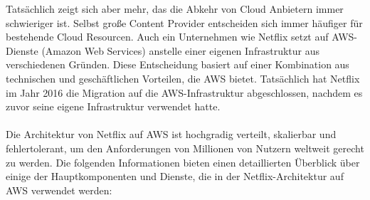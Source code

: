 Tatsächlich zeigt sich aber mehr, das die Abkehr von Cloud Anbietern immer schwieriger ist. Selbst große Content Provider entscheiden sich immer häufiger für bestehende Cloud Resourcen. Auch ein Unternehmen wie Netflix setzt auf AWS-Dienste (Amazon Web Services) anstelle einer eigenen Infrastruktur aus verschiedenen Gründen. Diese Entscheidung basiert auf einer Kombination aus technischen und geschäftlichen Vorteilen, die AWS bietet. Tatsächlich hat Netflix im Jahr 2016 die Migration auf die AWS-Infrastruktur abgeschlossen, nachdem es zuvor seine eigene Infrastruktur verwendet hatte. 
\\\\
Die Architektur von Netflix auf AWS ist hochgradig verteilt, skalierbar und fehlertolerant, um den Anforderungen von Millionen von Nutzern weltweit gerecht zu werden. Die folgenden Informationen bieten einen detaillierten Überblick über einige der Hauptkomponenten und Dienste, die in der Netflix-Architektur auf AWS verwendet werden:
